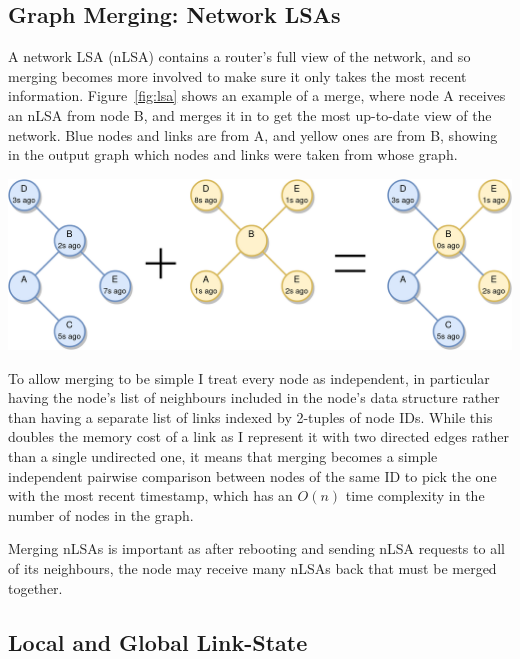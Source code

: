 \documentclass[withindex,glossary,openany]{cam-thesis}
\begin{document}
\subsection{Graph Merging: Network LSAs}
\label{subsec:merge_nlsa}

A network LSA (nLSA) contains a router's full view of the network, and so merging becomes more involved to make sure it only takes the most recent information. Figure~\ref{fig:lsa} shows an example of a merge, where node A receives an nLSA from node B, and merges it in to get the most up-to-date view of the network. Blue nodes and links are from A, and yellow ones are from B, showing in the output graph which nodes and links were taken from whose graph.

\begin{center}
\begin{minipage}{0.9\textwidth} \centering
	\includegraphics[width=1\textwidth]{lsa}
	\label{fig:lsa}
\end{minipage}
\end{center}

To allow merging to be simple I treat every node as independent, in particular having the node's list of neighbours included in the node's data structure rather than having a separate list of links indexed by 2-tuples of node IDs. While this doubles the memory cost of a link as I represent it with two directed edges rather than a single undirected one, it means that merging becomes a simple independent pairwise comparison between nodes of the same ID to pick the one with the most recent timestamp, which has an $O(n)$ time complexity in the number of nodes in the graph.

Merging nLSAs is important as after rebooting and sending nLSA requests to all of its neighbours, the node may receive many nLSAs back that must be merged together.

\subsection{Local and Global Link-State}
\label{subsec:landg_state}
\end{document}
